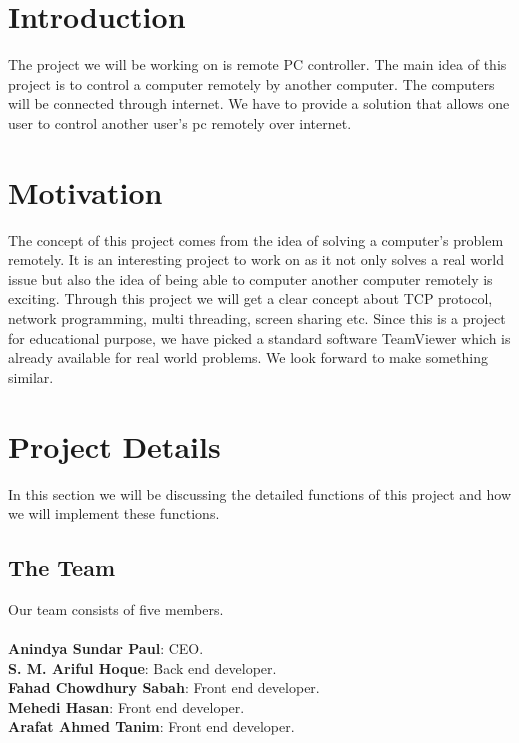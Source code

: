 \documentclass[12pt, a4paper]{article}
\begin{document}

 
 
\tableofcontents

\newpage

 
\section{Introduction}

The project we will be working on is remote PC controller. The main idea of this project is to control a computer remotely by another computer. The computers will be connected through internet. We have to provide a solution that allows one user to control another user's pc remotely over internet.

\section{Motivation}

The concept of this project comes from the idea of solving a computer's problem remotely. It is an interesting project to work on as it not only solves a real world issue but also the idea of being able to computer another computer remotely is exciting. Through this project we will get a clear concept about TCP protocol, network programming, multi threading, screen sharing etc. Since this is a project for educational purpose, we have picked a standard software TeamViewer which is already available for real world problems. We look forward to make something similar.

\section{Project Details}

In this section we will be discussing the detailed functions of this project and how we will implement these functions.

\subsection{The Team}

Our team consists of five members.\\ \\
\textbf{Anindya Sundar Paul}: CEO.\\
\textbf{S. M. Ariful Hoque}: Back end developer.\\
\textbf{Fahad Chowdhury Sabah}: Front end developer.\\
\textbf{Mehedi Hasan}: Front end developer.\\
\textbf{Arafat Ahmed Tanim}: Front end developer.\\
\end{document}
